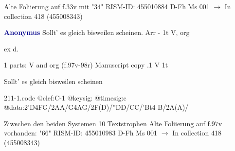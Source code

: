 \documentclass[twocolumn]{book}
\begin{document}
\newline Alte Foliierung auf f.33v mit "34"
\newline RISM-ID: 455010884
\newline D-Fh  Ms 001
\newline $\rightarrow$ In collection 418 (455008343)
      
\newline \par \vspace{7pt} \textcolor{darkblue}{\textbf{Anonymus  }}
\newline Sollt' es gleich bisweilen scheinen. Arr - 1t
\newline V, org
\newline \begin{itshape}[f.97v, at left:] ex d.\end{itshape} 
\newline \textcolor{darkblue}{}  1 parts: V and org  (f.97v-98r)
\newline Manuscript copy
.1  V  1t
\newline \begin{footnotesize} Sollt' es gleich bisweilen scheinen \end{footnotesize}  
\begin{filecontents*}{211-1.code}
@clef:C-1
@keysig:
@timesig:c
@data:2'D4FG/2AA/G4AG/2F(D)/''DD/CC/'Bt4-B/2A(A)/
\end{filecontents*}
\newline
%

\newline Ziwschen den beiden Systemen 10 Textstrophen
\newline Alte Foliierung auf f.97v vorhanden: "66"
\newline RISM-ID: 455010983
\newline D-Fh  Ms 001
\newline $\rightarrow$ In collection 418 (455008343)
      
\end{document}
